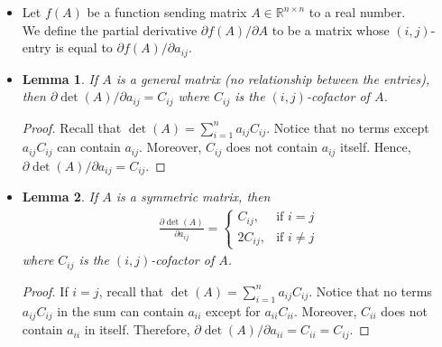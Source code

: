 \documentclass[10pt]{article}
\newtheorem{lemma}{Lemma}[section]
\begin{document}
\begin{itemize}
    \item Let $f(A)$ be a function sending matrix $A \in \mathbb{R}^{n\times n}$ to a real number.\\ 
    We define the partial derivative $\partial f(A) / \partial A$ to be a matrix whose $(i,j)$-entry is equal to $\partial f(A) / \partial a_{ij}$.
    
    \item \begin{lemma}
      If $A$ is a general matrix (no relationship between the entries), then $\partial \det(A)/\partial a_{ij} = C_{ij}$ where $C_{ij}$ is the $(i,j)$-cofactor of $A$.
    \end{lemma}
    \begin{proof}
      Recall that $\det(A) = \sum_{i=1}^n a_{ij} C_{ij}$. Notice that no terms except $a_{ij}C_{ij}$ can contain $a_{ij}$. Moreover, $C_{ij}$ does not contain $a_{ij}$ itself. Hence, $\partial \det(A)/\partial a_{ij} = C_{ij}$.
    \end{proof}    
    
    \item \begin{lemma}
      If $A$ is a symmetric matrix, then
      \begin{align*}
        \frac{\partial \det(A)}{\partial a_{ij}}
        = \begin{cases}
          C_{ij}, & \mbox{if }i=j\\
          2C_{ij}, & \mbox{if }i \neq j
        \end{cases}        
      \end{align*}
      where $C_{ij}$ is the $(i,j)$-cofactor of $A$.
    \end{lemma}
    
    \begin{proof}      
      If $i = j$, recall that $\det(A) = \sum_{i=1}^n a_{ij} C_{ij}$. Notice that no terms $a_{ij}C_{ij}$ in the sum can contain $a_{ii}$ except for $a_{ii}C_{ii}$. Moreover, $C_{ii}$ does not contain $a_{ii}$ in itself. Therefore, $\partial \det(A) / \partial a_{ii} = C_{ii} = C_{ij}.$
      

\end{proof}
\end{itemize}
\end{document}
